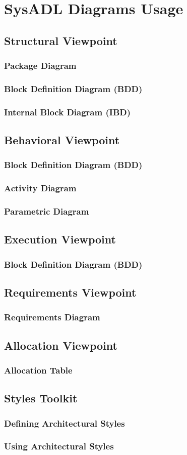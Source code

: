 \chapter{SysADL Diagrams Usage}

\section{Structural Viewpoint}
\subsection{Package Diagram}
\subsection{Block Definition Diagram (BDD)}
\subsection{Internal Block Diagram (IBD)}
\section{Behavioral Viewpoint}
\subsection{Block Definition Diagram (BDD)}
\subsection{Activity Diagram}
\subsection{Parametric Diagram}
\section{Execution Viewpoint}
\subsection{Block Definition Diagram (BDD)}
\section{Requirements Viewpoint}
\subsection{Requirements Diagram}
\section{Allocation Viewpoint}
\subsection{Allocation Table}
\section{Styles Toolkit}
\subsection{Defining Architectural Styles}
\subsection{Using Architectural Styles}